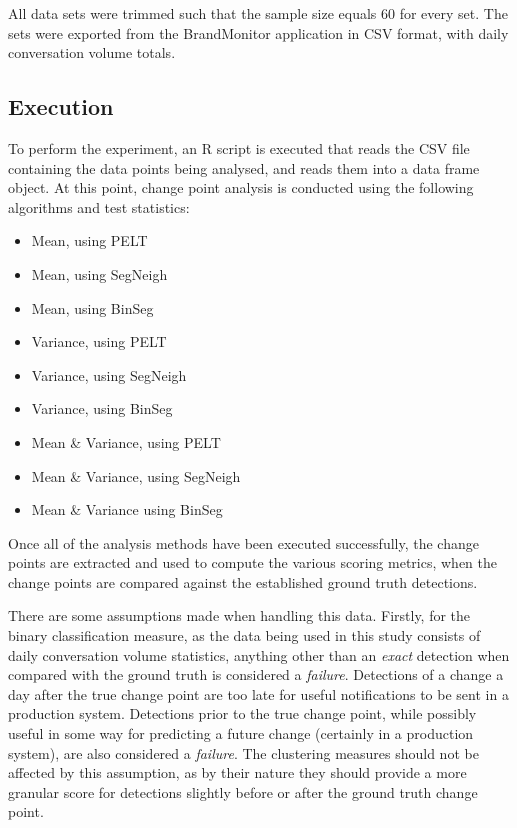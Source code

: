 \documentclass{uvamscse}	%
\begin{document}
All data sets were trimmed such that the sample size equals 60 for every set. The sets were exported from the BrandMonitor application in CSV format, with daily conversation volume totals.

\subsection{Execution}

To perform the experiment, an \textsf{R} script is executed that reads the CSV file containing the data points being analysed, and reads them into a data frame object. At this point, change point analysis is conducted using the following algorithms and test statistics:

\begin{itemize}
    \item Mean, using PELT
    \item Mean, using SegNeigh
    \item Mean, using BinSeg
    \item Variance, using PELT
    \item Variance, using SegNeigh
    \item Variance, using BinSeg
    \item Mean \& Variance, using PELT
    \item Mean \& Variance, using SegNeigh
    \item Mean \& Variance using BinSeg
\end{itemize}

Once all of the analysis methods have been executed successfully, the change points are extracted and used to compute the various scoring metrics, when the change points are compared against the established ground truth detections.

There are some assumptions made when handling this data. Firstly, for the binary classification measure, as the data being used in this study consists of daily conversation volume statistics, anything other than an \emph{exact} detection when compared with the ground truth is considered a \emph{failure}. Detections of a change a day after the true change point are too late for useful notifications to be sent in a production system. Detections prior to the true change point, while possibly useful in some way for predicting a future change (certainly in a production system), are also considered a \emph{failure}. The clustering measures should not be affected by this assumption, as by their nature they should provide a more granular score for detections slightly before or after the ground truth change point.
\end{document}
